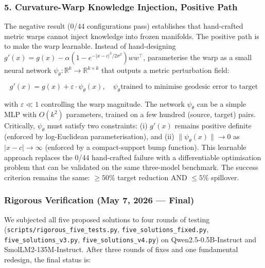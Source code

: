 \documentclass[11pt]{article}
\begin{document}
\subsubsection{5. Curvature-Warp Knowledge Injection, Positive Path}

The negative result (0/44 configurations pass) establishes that
hand-crafted metric warps cannot inject knowledge into frozen manifolds. The
positive path is to make the warp learnable. Instead of
hand-designing $g'(x) = g(x) - \alpha(1-e^{-|x-c|^2/2\sigma^2})ww^\top$,
parameterise the warp as a small neural network $\psi_\theta: \mathbb{R}^k
\to \mathbb{R}^{k \times k}$ that outputs a metric perturbation field:

\begin{equation}
g'(x) = g(x) + \varepsilon \cdot \psi_\theta(x), \quad \psi_\theta \text{
trained to minimise geodesic error to target}
\end{equation}

with $\varepsilon \ll 1$ controlling the warp magnitude. The network
$\psi_\theta$ can be a simple MLP with $O(k^2)$ parameters, trained on a few
hundred (source, target) pairs. Critically, $\psi_\theta$ must satisfy two
constraints: (i) $g'(x)$ remains positive definite (enforced by
log-Euclidean parameterisation), and (ii) $\|\psi_\theta(x)\| \to 0$ as
$|x-c| \to \infty$ (enforced by a compact-support bump function). This
learnable approach replaces the 0/44 hand-crafted failure with a
differentiable optimisation problem that can be validated on the same
three-model benchmark. The success criterion remains the same: $\ge 50\%$
target reduction AND $\le 5\%$ spillover.

\subsubsection{Rigorous Verification (May 7, 2026 — Final)}

We subjected all five proposed solutions to four rounds of testing
(\texttt{scripts/rigorous\_five\_tests.py},
\texttt{five\_solutions\_fixed.py},
\texttt{five\_solutions\_v3.py},
\texttt{five\_solutions\_v4.py}) on Qwen2.5-0.5B-Instruct and
SmolLM2-135M-Instruct. After three rounds of fixes and one fundamental
redesign, the final status is:
\end{document}

